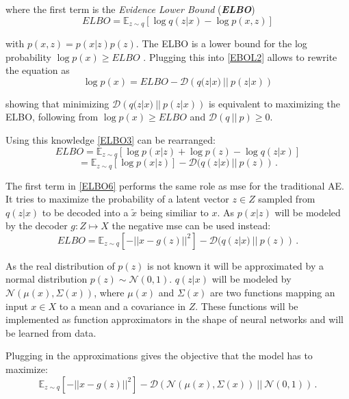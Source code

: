 \documentclass[a4paper]{IEEEtran}
\begin{document}
where the first term is the \textit{Evidence Lower Bound} (\textit{\textbf{ELBO}})
\begin{equation}
	ELBO = \mathbb{E}_{z \sim q} \left[ \log q(z|x) - \log p(x,z) \right]
	\label{ELBO3}
\end{equation} 

with $p(x,z) = p(x|z)p(z)$. The ELBO is a lower bound for the log probability $\log p(x) \geq ELBO$ \cite{kingma_2019}. Plugging this into \eqref{EBOL2} allows to rewrite the equation as
\begin{equation}
	\log p(x) = ELBO - \mathcal{D}\left(q(z|x) \ || \ p(z|x) \right)
	\label{ELBO4}
\end{equation}

showing that minimizing $\mathcal{D}\left(q(z|x) \ || \ p(z|x) \right)$ is equivalent to maximizing the ELBO, following from $\log p(x) \geq ELBO$ and $\mathcal{D}(q \ || \ p) \geq 0$.

Using this knowledge \eqref{ELBO3} can be rearranged:
\begin{equation}
	ELBO = \mathbb{E}_{z \sim q}\left[ \log p(x|z) + \log p(z) - \log q(z|x) \right]
	\label{ELBO5}
\end{equation}
\begin{equation}
	= \mathbb{E}_{z \sim q}\left[ \log p(x|z) \right] - \mathcal{D}(q(z|x) \ || \ p(z))\,.
	\label{ELBO6}
\end{equation}

The first term in \eqref{ELBO6} performs the same role as mse for the traditional AE. It tries to maximize the probability of a latent vector $z \in Z$ sampled from $q(z|x)$ to be decoded into a $\tilde{x}$ being similiar to $x$. As $p(x|z)$ will be modeled by the decoder $g : Z \mapsto X$ the negative mse can be used instead:
\begin{equation}
	ELBO = \mathbb{E}_{z \sim q}\left[ -||x - g(z)||^2 \right] - \mathcal{D}(q(z|x) \ || \ p(z))\,.
	\label{ELBO7}
\end{equation}

As the real distribution of $p(z)$ is not known it will be approximated by a normal distribution $p(z) \sim \mathcal{N}(0,1)$. $q(z|x)$ will be modeled by $\mathcal{N}(\mu(x), \Sigma(x))$, where $\mu(x)$ and $\Sigma(x)$ are two functions mapping an input $x \in X$ to a mean and a covariance in $Z$. These functions will be implemented as function approximators in the shape of neural networks and will be learned from data.

Plugging in the approximations gives the objective that the model has to maximize:
\begin{equation}
	\mathbb{E}_{z \sim q}\left[ -||x - g(z)||^2 \right] - \mathcal{D}(\mathcal{N}(\mu(x), \Sigma(x)) \ || \ \mathcal{N}(0, 1))\,.
\end{equation}
\end{document}

